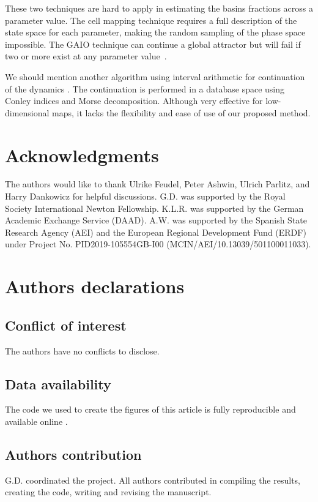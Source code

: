 \documentclass[%
 aip,
 amsmath,amssymb,
 reprint,%
]{revtex4-1}
\begin{document}
These two techniques are hard to apply in estimating the basins fractions across a parameter value. The cell mapping technique requires a full description of the state space for each parameter, making the random sampling of the phase space impossible. The GAIO technique can continue a global attractor but will fail if two or more exist at any parameter value~\cite{gerlach2020set}.

We should mention another algorithm using interval arithmetic for continuation of the dynamics \cite{arai2009database}. The continuation is performed in a database space using Conley indices and Morse decomposition. Although very effective for low-dimensional maps, it lacks the flexibility and ease of use of our proposed method. 


\section*{Acknowledgments}
The authors would like to thank Ulrike Feudel, Peter Ashwin, Ulrich Parlitz, and Harry Dankowicz for helpful discussions.
G.D. was supported by the Royal Society International Newton Fellowship. 
K.L.R. was supported by the German Academic Exchange Service (DAAD).
A.W. was supported by the Spanish State Research Agency (AEI) and the European Regional Development Fund (ERDF) under Project No. PID2019-105554GB-I00 (MCIN/AEI/10.13039/501100011033).

\section*{Authors declarations}
\subsection*{Conflict of interest}
The authors have no conflicts to disclose.

\subsection*{Data availability}

The code we used to create the figures of this article is fully reproducible and available online \cite{codebase}.


\subsection*{Authors contribution}
G.D. coordinated the project. All authors contributed in compiling the results, creating the code, writing and revising the manuscript.


\end{document}
